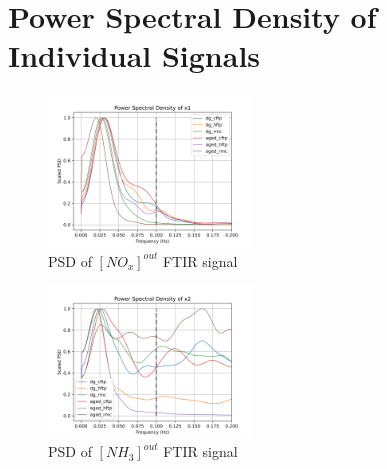 \section{Power Spectral Density of Individual Signals}

\begin{multicols}{2}
       \begin{figure}[H]
        \centering
        \includegraphics[width=0.48\textwidth]{./figs/bfr_smth/test_psd/x1.png}
        \caption{PSD of $[NO_x]^{out}$ FTIR signal}
       \end{figure}

       \begin{figure}[H]
        \centering
        \includegraphics[width=0.48\textwidth]{./figs/bfr_smth/test_psd/x2.png}
        \caption{PSD of $[NH_3]^{out}$ FTIR signal}
       \end{figure}
\end{multicols}
